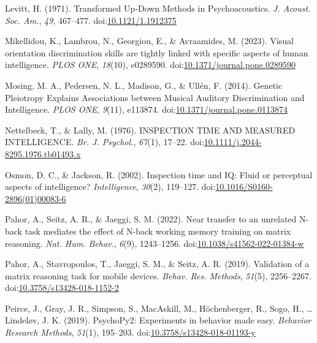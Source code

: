 \documentclass[
  ,man]{apa6}
\newlength{\cslhangindent}
\newenvironment{CSLReferences}[2] %
 {\begin{list}{}{%
  \setlength{\itemindent}{0pt}
  \setlength{\leftmargin}{0pt}
  \setlength{\parsep}{0pt}
  \ifodd #1
   \setlength{\leftmargin}{\cslhangindent}
   \setlength{\itemindent}{-1\cslhangindent}
  \fi
  \setlength{\itemsep}{#2\baselineskip}}}
 {\end{list}}
\begin{document}
\begin{CSLReferences}{1}{0}
Levitt, H. (1971). Transformed {Up}‐{Down Methods} in {Psychoacoustics}. \emph{J. Acoust. Soc. Am.}, \emph{49}, 467--477. doi:\href{https://doi.org/10.1121/1.1912375}{10.1121/1.1912375}

Mikellidou, K., Lambrou, N., Georgiou, E., \& Avraamides, M. (2023). Visual orientation discrimination skills are tightly linked with specific aspects of human intelligence. \emph{PLOS ONE}, \emph{18}(10), e0289590. doi:\href{https://doi.org/10.1371/journal.pone.0289590}{10.1371/journal.pone.0289590}

Mosing, M. A., Pedersen, N. L., Madison, G., \& Ullén, F. (2014). Genetic {Pleiotropy Explains Associations} between {Musical Auditory Discrimination} and {Intelligence}. \emph{PLOS ONE}, \emph{9}(11), e113874. doi:\href{https://doi.org/10.1371/journal.pone.0113874}{10.1371/journal.pone.0113874}

Nettelbeck, T., \& Lally, M. (1976). {INSPECTION TIME AND MEASURED INTELLIGENCE}. \emph{Br. J. Psychol.}, \emph{67}(1), 17--22. doi:\href{https://doi.org/10.1111/j.2044-8295.1976.tb01493.x}{10.1111/j.2044-8295.1976.tb01493.x}

Osmon, D. C., \& Jackson, R. (2002). Inspection time and {IQ}: {Fluid} or perceptual aspects of intelligence? \emph{Intelligence}, \emph{30}(2), 119--127. doi:\href{https://doi.org/10.1016/S0160-2896(01)00083-6}{10.1016/S0160-2896(01)00083-6}

Pahor, A., Seitz, A. R., \& Jaeggi, S. M. (2022). Near transfer to an unrelated {N}-back task mediates the effect of {N}-back working memory training on matrix reasoning. \emph{Nat. Hum. Behav.}, \emph{6}(9), 1243--1256. doi:\href{https://doi.org/10.1038/s41562-022-01384-w}{10.1038/s41562-022-01384-w}

Pahor, A., Stavropoulos, T., Jaeggi, S. M., \& Seitz, A. R. (2019). Validation of a matrix reasoning task for mobile devices. \emph{Behav. Res. Methods}, \emph{51}(5), 2256--2267. doi:\href{https://doi.org/10.3758/s13428-018-1152-2}{10.3758/s13428-018-1152-2}

Peirce, J., Gray, J. R., Simpson, S., MacAskill, M., Höchenberger, R., Sogo, H., \ldots{} Lindeløv, J. K. (2019). {PsychoPy2}: {Experiments} in behavior made easy. \emph{Behavior Research Methods}, \emph{51}(1), 195--203. doi:\href{https://doi.org/10.3758/s13428-018-01193-y}{10.3758/s13428-018-01193-y}


\end{CSLReferences}
\end{document}
